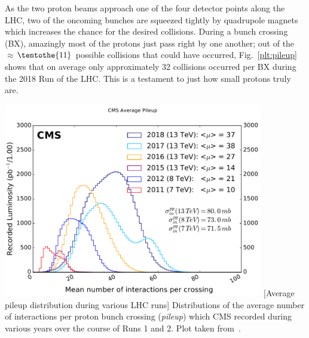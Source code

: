 As the two proton beams approach one of the four detector points along the LHC, two of the oncoming bunches are squeezed tightly by quadrupole magnets which increases the chance for the desired \pp collisions.
During a bunch crossing (BX), amazingly most of the protons just pass right by one another; 
out of the $\approx$$\tentothe{11}$ possible \pp collisions that could have occurred, Fig.~\ref{plt:pileup} shows that on average only approximately 32 collisions occurred per BX during the 2018 Run of the LHC. %
This is a testament to just how small protons truly are.
\begin{multiFigure}
    \centering
    \includegraphics[width=0.85\textwidth,keepaspectratio]{figures/lhc/pileup_allYears.pdf}
        [Average pileup distribution during various LHC runs]
        {Distributions of the average number of \pp interactions per proton bunch crossing (\emph{pileup}) which CMS recorded during various years over the course of Runs 1 and 2.
        Plot taken from~\cite{pileup}.
        } 
    \label{plt:pileup}
\end{multiFigure}

